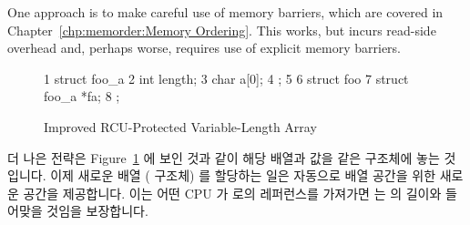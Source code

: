 One approach is to make careful use of memory barriers, which are
covered in Chapter~\ref{chp:memorder:Memory Ordering}.
This works, but incurs read-side overhead and, perhaps worse, requires
use of explicit memory barriers.
\fi

\begin{figure}[tbp]
{ \scriptsize
\begin{verbbox}
 1 struct foo_a {
 2   int length;
 3   char a[0];
 4 };
 5 
 6 struct foo {
 7   struct foo_a *fa;
 8 };
\end{verbbox}
}
\centering
\theverbbox
\caption{Improved RCU-Protected Variable-Length Array}
\label{fig:together:Improved RCU-Protected Variable-Length Array}
\end{figure}

더 나은 전략은
Figure~\ref{fig:together:Improved RCU-Protected Variable-Length Array}
에 보인 것과 같이 해당 배열과 값을 같은 구조체에 놓는 것입니다.
이제 새로운 배열 ( 구조체) 를 할당하는 일은 자동으로 배열 공간을 위한
새로운 공간을 제공합니다.
이는 어떤 CPU 가  로의 레퍼런스를 가져가면  는 
의 길이와 들어맞을 것임을 보장합니다.
\iffalse

A better approach is to put the value and the array into the same structure,
as shown in
Figure~\ref{fig:together:Improved RCU-Protected Variable-Length Array}.
Allocating a new array (\co{foo_a} structure) then automatically provides
a new place for the array length.
This means that if any CPU picks up a reference to \co{->fa}, it is
guaranteed that the \co{->length} will match the \co{->a[]}
length~\cite{Arcangeli03}.
\fi

